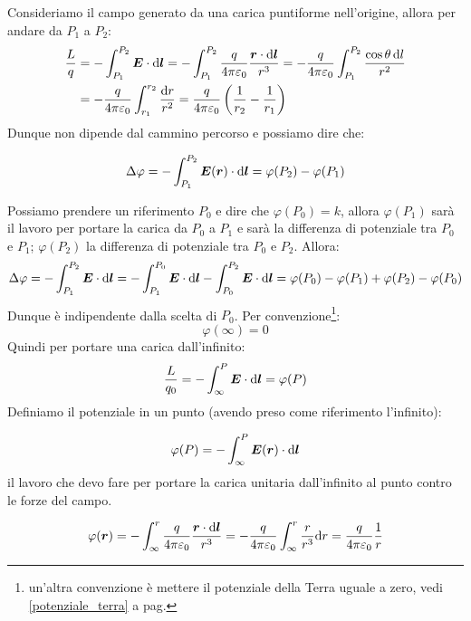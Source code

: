 Consideriamo il campo generato da una carica puntiforme nell'origine, allora per andare da $P_1$ a $P_2$:
\begin{align*}
\frac{L}{q}&=-\int_{P_1}^{P_2}\boldsymbol{E}\cdot\mathrm{d}\boldsymbol{l}=-\int_{P_1}^{P_2}\frac{q}{4\pi\varepsilon_0}\frac{\boldsymbol{r}\cdot\mathrm{d}\boldsymbol{l}}{r^3}=-\frac{q}{4\pi\varepsilon_0}\int_{P_1}^{P_2}\frac{\cos\theta\,\mathrm{d} l}{r^2}\\
&=-\frac{q}{4\pi\varepsilon_0}\int_{r_1}^{r_2}\frac{\mathrm{d} r}{r^2}=\frac{q}{4\pi\varepsilon_0}\left(\frac{1}{r_2}-\frac{1}{r_1}\right)
\end{align*}
Dunque non dipende dal cammino percorso e possiamo dire che:
\begin{Teo}
\begin{equation}
\Delta \varphi=-\int_{P_1}^{P_2}\boldsymbol{E}(\boldsymbol{r})\cdot\mathrm{d}\boldsymbol{l}=\varphi(P_2)-\varphi(P_1)
\end{equation}
\end{Teo}
Possiamo prendere un riferimento $P_0$ e dire che $\varphi(P_0)=k$, allora $\varphi(P_1)$ sarà il lavoro per portare la carica da $P_0$ a $P_1$ e sarà la differenza di potenziale tra $P_0$ e $P_1$; $\varphi(P_2)$ la differenza di potenziale tra $P_0$ e $P_2$. Allora:
\begin{equation*}\Delta \varphi=-\int_{P_1}^{P_2}\boldsymbol{E}\cdot\mathrm{d}\boldsymbol{l}=-\int_{P_1}^{P_0}\boldsymbol{E}\cdot\mathrm{d}\boldsymbol{l}-\int_{P_0}^{P_2}\boldsymbol{E}\cdot\mathrm{d}\boldsymbol{l}=\varphi(P_0)-\varphi(P_1)+\varphi(P_2)-\varphi(P_0)\end{equation*}
Dunque è indipendente dalla scelta di $P_0$. Per convenzione\footnote{un'altra convenzione è mettere il potenziale della Terra uguale a zero, vedi \eqref{potenziale_terra} a pag.\@\pageref{potenziale_terra}}:
\begin{equation*}\varphi(\infty)=0\end{equation*}
Quindi per portare una carica dall'infinito:
\begin{equation*}\frac{L}{q_0}=-\int_{\infty}^{P}\boldsymbol{E}\cdot\mathrm{d} \boldsymbol{l}=\varphi(P)\end{equation*}
Definiamo il potenziale in un punto (avendo preso come riferimento l'infinito):
\begin{Def}[potenziale]
\begin{equation}
\varphi(P)=-\int_{\infty}^P\boldsymbol{E}(\boldsymbol{r})\cdot\mathrm{d}\boldsymbol{l}
\end{equation}
il lavoro che devo fare per portare la carica unitaria dall'infinito al punto contro le forze del campo.
\end{Def}
\begin{Es}
\begin{equation*}
\varphi(\boldsymbol{r})=-\int_{\infty}^r\frac{q}{4\pi\varepsilon_0}\frac{\boldsymbol{r}\cdot\mathrm{d}\boldsymbol{l}}{r^3}=-\frac{q}{4\pi\varepsilon_0}\int_\infty^r\frac{r}{r^3}\mathrm{d} r=\frac{q}{4\pi\varepsilon_0}\frac{1}{r}
\end{equation*}
\end{Es}
